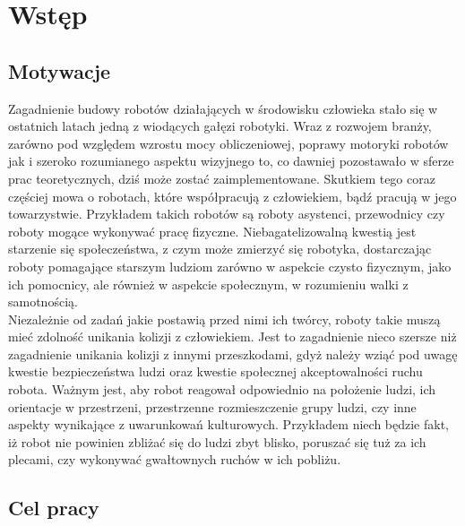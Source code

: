 \chapter{Wstęp}

\section{Motywacje}

\indent Zagadnienie budowy robotów działających w środowisku człowieka stało się w ostatnich latach jedną z wiodących gałęzi robotyki. Wraz z rozwojem branży, zarówno pod względem wzrostu mocy obliczeniowej, poprawy motoryki robotów jak i szeroko rozumianego aspektu wizyjnego to, co dawniej pozostawało w sferze prac teoretycznych, dziś może zostać zaimplementowane. Skutkiem tego coraz częściej mowa o robotach, które współpracują z człowiekiem, bądź pracują w jego towarzystwie. Przykładem takich robotów są roboty asystenci, przewodnicy czy roboty mogące wykonywać pracę fizyczne. Niebagatelizowalną kwestią jest starzenie się społeczeństwa, z czym może zmierzyć się robotyka, dostarczając roboty pomagające starszym ludziom zarówno w aspekcie czysto fizycznym, jako ich pomocnicy, ale również w aspekcie społecznym, w rozumieniu walki z samotnością. \\
\indent Niezależnie od zadań jakie postawią przed nimi ich twórcy, roboty takie muszą mieć zdolność unikania kolizji z człowiekiem. Jest to zagadnienie nieco szersze niż zagadnienie unikania kolizji z innymi przeszkodami, gdyż należy wziąć pod uwagę kwestie bezpieczeństwa ludzi oraz kwestie społecznej akceptowalności ruchu robota. Ważnym jest, aby robot reagował odpowiednio na położenie ludzi, ich orientacje w przestrzeni, przestrzenne rozmieszczenie grupy ludzi, czy inne aspekty wynikające z uwarunkowań kulturowych. Przykładem niech będzie fakt, iż robot nie powinien zbliżać się do ludzi zbyt blisko, poruszać się tuż za ich plecami, czy wykonywać gwałtownych ruchów w ich pobliżu.

\section{Cel pracy}

